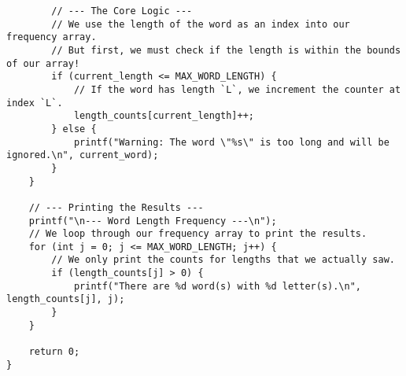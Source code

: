\documentclass[11pt]{book}
\begin{document}
\begin{verbatim}
        // --- The Core Logic ---
        // We use the length of the word as an index into our frequency array.
        // But first, we must check if the length is within the bounds of our array!
        if (current_length <= MAX_WORD_LENGTH) {
            // If the word has length `L`, we increment the counter at index `L`.
            length_counts[current_length]++;
        } else {
            printf("Warning: The word \"%s\" is too long and will be ignored.\n", current_word);
        }
    }

    // --- Printing the Results ---
    printf("\n--- Word Length Frequency ---\n");
    // We loop through our frequency array to print the results.
    for (int j = 0; j <= MAX_WORD_LENGTH; j++) {
        // We only print the counts for lengths that we actually saw.
        if (length_counts[j] > 0) {
            printf("There are %d word(s) with %d letter(s).\n", length_counts[j], j);
        }
    }

    return 0;
}

\end{verbatim}
\clearpage
\end{document}
